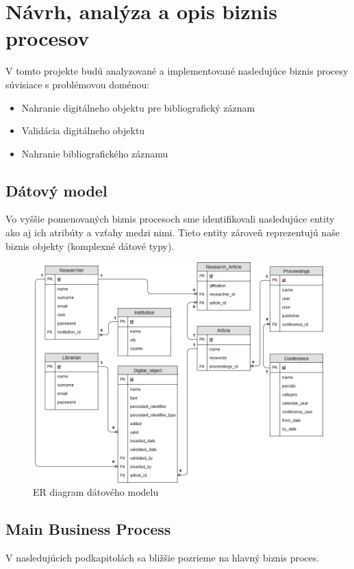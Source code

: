 \documentclass[10pt,oneside,slovak,a4paper]{article}
\begin{document}
\section{Návrh, analýza a opis biznis procesov}

V tomto projekte budú analyzované a implementované nasledujúce biznis procesy súvisiace s problémovou doménou:

\begin{itemize}
\item Nahranie digitálneho objektu pre bibliografický záznam
\item Validácia digitálneho objektu
\item Nahranie bibliografického záznamu
\end{itemize}

\newpage

\subsection{Dátový model}
Vo vyššie pomenovaných biznis procesoch sme identifikovali nasledujúce entity ako aj ich atribúty a vzťahy medzi nimi. Tieto entity zároveň reprezentujú naše biznis objekty (komplexné dátové typy).

\begin{figure} [H]
\label{datamodel}
\centering
\includegraphics[scale=0.4]{datovy_model.png} 
\caption{ER diagram dátového modelu}
\end{figure}

\subsection{Main Business Process}
V nasledujúcich podkapitolách sa bližšie pozrieme na hlavný biznis proces.
\end{document}

